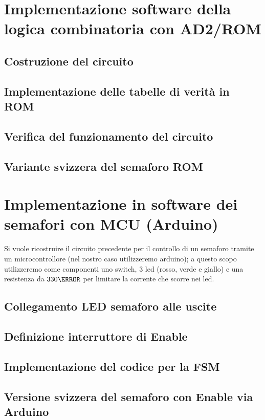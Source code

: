 \documentclass[10pt, a4paper, italian]{article}
\begin{document}
\section{Implementazione software della logica combinatoria con AD2/ROM}
\subsection{Costruzione del circuito}

\subsection{Implementazione delle tabelle di verità in ROM}

\subsection{Verifica del funzionamento del circuito}

\subsection{Variante svizzera del semaforo ROM}

\section{Implementazione in software dei semafori con MCU (Arduino)}
Si vuole ricostruire il circuito precedente per il controllo di un semaforo tramite un microcontrollore (nel nostro caso utilizzeremo arduino); a questo scopo utilizzeremo come componenti uno switch, 3 led (rosso, verde e giallo) e una resistenza da $330 \ohm$ per limitare la corrente che scorre nei led.
\subsection{Collegamento LED semaforo alle uscite}

\subsection{Definizione interruttore di Enable}

\subsection{Implementazione del codice per la FSM}

\subsection{Versione svizzera del semaforo con Enable via Arduino}
\end{document}
